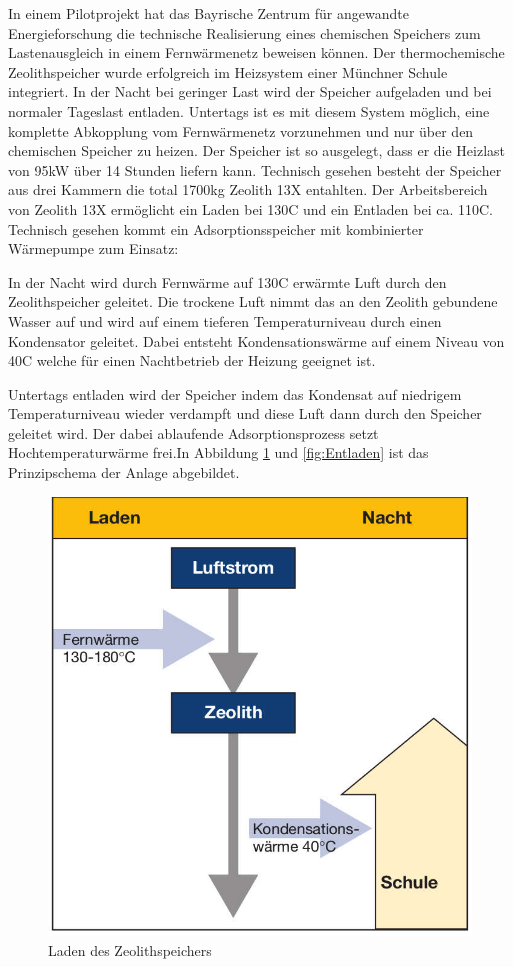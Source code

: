 \documentclass[11pt,a4paper]{scrartcl}
\begin{document}
{In einem Pilotprojekt hat das Bayrische Zentrum für angewandte Energieforschung
die technische Realisierung eines chemischen Speichers zum Lastenausgleich in
einem Fernwärmenetz beweisen können. Der thermochemische Zeolithspeicher wurde
erfolgreich im Heizsystem einer Münchner Schule integriert. In der Nacht bei
geringer Last wird der Speicher aufgeladen und bei normaler Tageslast entladen.
Untertags ist es mit diesem System möglich, eine komplette Abkopplung vom
Fernwärmenetz vorzunehmen und nur über den chemischen Speicher zu heizen. Der
Speicher ist so ausgelegt, dass er die Heizlast von 95kW über 14 Stunden liefern
kann. Technisch gesehen besteht der Speicher aus drei Kammern die total 1700kg
Zeolith 13X entahlten. Der Arbeitsbereich von Zeolith 13X ermöglicht ein Laden
bei 130\textdegree C und ein Entladen bei ca. 110\textdegree C. Technisch
gesehen kommt ein Adsorptionsspeicher mit kombinierter Wärmepumpe zum Einsatz:

In der Nacht wird durch Fernwärme auf 130\textdegree C erwärmte Luft durch den
Zeolithspeicher geleitet. Die trockene Luft nimmt das an den Zeolith gebundene
Wasser auf und wird auf einem tieferen Temperaturniveau durch einen Kondensator
geleitet. Dabei entsteht Kondensationswärme auf einem Niveau von 40\textdegree C
welche für einen Nachtbetrieb der Heizung geeignet ist. 

Untertags entladen wird der Speicher indem das Kondensat auf niedrigem
Temperaturniveau wieder verdampft und diese Luft dann durch den Speicher
geleitet wird. Der dabei ablaufende Adsorptionsprozess setzt Hochtemperaturwärme
frei.In Abbildung \ref{fig:Laden} und \ref{fig:Entladen} ist das Prinzipschema
der Anlage abgebildet.

\begin{figure}[h!]
\begin{center}
\includegraphics[scale=1]{images/Laden.jpg}
\caption{Laden des Zeolithspeichers \cite{BINE2}}
\label{fig:Laden}
\end{center}
\end{figure}

}
\end{document}
